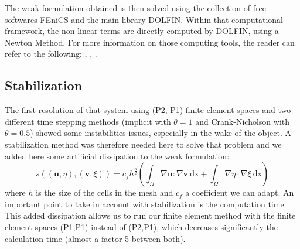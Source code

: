\documentclass[11pt,a4paper]{article}
\begin{document}
	The weak formulation obtained is then solved using the collection of free softwares FEniCS and the main library DOLFIN. Within that computational framework, the non-linear terms are directly computed by DOLFIN, using a Newton Method. For more information on those computing tools, the reader can refer to the following: \cite{LoggMardalEtAl2012a}, \cite{LoggWellsEtAl2012a}, \cite{LoggWells2010a}.
			
\subsection{Stabilization}
	The first resolution of that system using (P2, P1) finite element spaces and two different time stepping methods (implicit with $\theta=1$ and Crank-Nicholson with $\theta = 0.5$)	showed some instabilities issues, especially in the wake of the object. A stabilization method was therefore needed here to solve that problem and we added here some artificial dissipation to the weak formulation:
	\begin{equation}
		s((\mathbf{u}, \eta),(\mathbf{v}, \xi)) = c_f h^{\frac{3}{2}}\left(\int_{\Omega}{\! \nabla \mathbf{u} : \nabla \mathbf{v} \: \mathrm{dx}} + \int_{\Omega}{\!\nabla \eta \cdot \nabla \xi \: \mathrm{dx}} \right)
	\end{equation}
	where $h$ is the size of the cells in the mesh and $c_f$ a coefficient we can adapt. An important point to take in account with stabilization is the computation time. This added dissipation allows us to run our finite element method with the finite element spaces (P1,P1) instead of (P2,P1), which decreases significantly the calculation time (almost a factor 5 between both).
\end{document}

